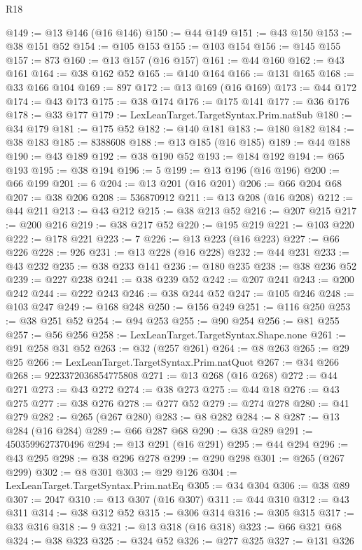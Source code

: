\begin{lexlean}{R18}
\begin{coremodule}
@149 := @13 @146 (@16 @146)
@150 := @44 @149
@151 := @43 @150
@153 := @38 @151 @52
@154 := @105 @153
@155 := @103 @154
@156 := @145 @155
@157 := 873
@160 := @13 @157 (@16 @157)
@161 := @44 @160
@162 := @43 @161
@164 := @38 @162 @52
@165 := @140 @164
@166 := @131 @165
@168 := @33 @166 @104
@169 := 897
@172 := @13 @169 (@16 @169)
@173 := @44 @172
@174 := @43 @173
@175 := @38 @174
@176 := @175 @141
@177 := @36 @176
@178 := @33 @177
@179 := LexLeanTarget.TargetSyntax.Prim.natSub
@180 := @34 @179
@181 := @175 @52
@182 := @140 @181
@183 := @180 @182
@184 := @38 @183
@185 := 8388608
@188 := @13 @185 (@16 @185)
@189 := @44 @188
@190 := @43 @189
@192 := @38 @190 @52
@193 := @184 @192
@194 := @65 @193
@195 := @38 @194
@196 := 5
@199 := @13 @196 (@16 @196)
@200 := @66 @199
@201 := 6
@204 := @13 @201 (@16 @201)
@206 := @66 @204 @68
@207 := @38 @206
@208 := 536870912
@211 := @13 @208 (@16 @208)
@212 := @44 @211
@213 := @43 @212
@215 := @38 @213 @52
@216 := @207 @215
@217 := @200 @216
@219 := @38 @217 @52
@220 := @195 @219
@221 := @103 @220
@222 := @178 @221
@223 := 7
@226 := @13 @223 (@16 @223)
@227 := @66 @226
@228 := 926
@231 := @13 @228 (@16 @228)
@232 := @44 @231
@233 := @43 @232
@235 := @38 @233 @141
@236 := @180 @235
@238 := @38 @236 @52
@239 := @227 @238
@241 := @38 @239 @52
@242 := @207 @241
@243 := @200 @242
@244 := @222 @243
@246 := @38 @244 @52
@247 := @105 @246
@248 := @103 @247
@249 := @168 @248
@250 := @156 @249
@251 := @116 @250
@253 := @38 @251 @52
@254 := @94 @253
@255 := @90 @254
@256 := @81 @255
@257 := @56 @256
@258 := LexLeanTarget.TargetSyntax.Shape.none
@261 := @91 @258 @31 @52
@263 := @32 (@257 @261)
@264 := @8 @263
@265 := @29 @25
@266 := LexLeanTarget.TargetSyntax.Prim.natQuot
@267 := @34 @266
@268 := 9223372036854775808
@271 := @13 @268 (@16 @268)
@272 := @44 @271
@273 := @43 @272
@274 := @38 @273
@275 := @44 @18
@276 := @43 @275
@277 := @38 @276
@278 := @277 @52
@279 := @274 @278
@280 := @41 @279
@282 := @265 (@267 @280)
@283 := @8 @282
@284 := 8
@287 := @13 @284 (@16 @284)
@289 := @66 @287 @68
@290 := @38 @289
@291 := 4503599627370496
@294 := @13 @291 (@16 @291)
@295 := @44 @294
@296 := @43 @295
@298 := @38 @296 @278
@299 := @290 @298
@301 := @265 (@267 @299)
@302 := @8 @301
@303 := @29 @126
@304 := LexLeanTarget.TargetSyntax.Prim.natEq
@305 := @34 @304
@306 := @38 @89
@307 := 2047
@310 := @13 @307 (@16 @307)
@311 := @44 @310
@312 := @43 @311
@314 := @38 @312 @52
@315 := @306 @314
@316 := @305 @315
@317 := @33 @316
@318 := 9
@321 := @13 @318 (@16 @318)
@323 := @66 @321 @68
@324 := @38 @323
@325 := @324 @52
@326 := @277 @325
@327 := @131 @326

\end{coremodule}
\end{lexlean}
